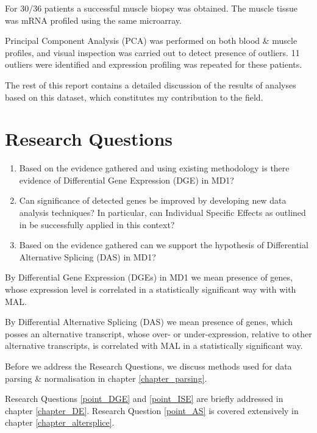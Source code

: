 For 30/36 patients a successful muscle biopsy was obtained. The muscle tissue was mRNA profiled using the same microarray.

Principal Component Analysis (PCA) was performed on both blood \& muscle profiles, and visual inspection was carried out to detect presence of outliers. 11 outliers were identified and expression profiling was repeated for these patients.

The rest of this report contains a detailed discussion of the results of analyses based on this dataset, which constitutes my contribution to the field.

\section{Research Questions} \label{chapter_researchquestion}

\begin{enumerate}
\item \label{point_DGE} Based on the evidence gathered and using existing methodology is there evidence of Differential Gene Expression (DGE) in MD1?
\item \label{point_ISE} Can significance of detected genes be improved by developing new data analysis techniques? In particular, can Individual Specific Effects as outlined in \parencite{Kurkiewicz2017} be successfully applied in this context?
\item \label{point_AS} Based on the evidence gathered can we support the hypothesis of Differential Alternative Splicing (DAS) in MD1?
\end{enumerate}

By Differential Gene Expression (DGEs) in MD1 we mean presence of genes, whose expression level is correlated in a statistically significant way with with MAL.

By Differential Alternative Splicing (DAS) we mean presence of genes, which posses an alternative transcript, whose over- or under-expression, relative to other alternative transcripts, is correlated with MAL in a statistically significant way.

Before we address the Research Questions, we discuss methods used for data parsing \& normalisation in chapter \ref{chapter_parsing}.

Research Questions \ref{point_DGE} and \ref{point_ISE} are briefly addressed in chapter \ref{chapter_DE}. Research Question \ref{point_AS} is covered extensively in chapter \ref{chapter_altersplice}.

